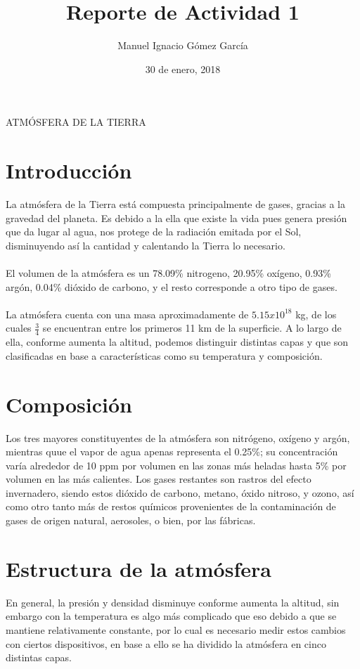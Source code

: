 \documentclass{article}
\title{Reporte de Actividad 1}
\author{Manuel Ignacio Gómez García}
\date{30 de enero, 2018}
\begin{document}
\maketitle ATMÓSFERA DE LA TIERRA

\section{Introducción}

La atmósfera de la Tierra está compuesta principalmente de gases, gracias a la gravedad del planeta. Es debido a la ella que existe la vida pues genera presión que da lugar al agua, nos protege de la radiación emitada por el Sol, disminuyendo así la cantidad y calentando la Tierra lo necesario.
\\
\\ El volumen de la atmósfera es un 78.09\% nitrogeno, 20.95\% oxígeno, 0.93\% argón, 0.04\% dióxido de carbono, y el resto corresponde a otro tipo de gases.
\\
\\ La atmósfera cuenta con una masa aproximadamente de $5.15x10^{18}$ kg, de los cuales $\frac{3}{4}$ se encuentran entre los primeros 11 km de la superficie. A lo largo de ella, conforme aumenta la altitud, podemos distinguir distintas capas y que son clasificadas en base a características como su temperatura y composición.

\section{Composición}

Los tres mayores constituyentes de la atmósfera son nitrógeno, oxígeno y argón, mientras quue el vapor de agua apenas representa el 0.25\%; su concentración varía alrededor de 10 ppm por volumen en las zonas más heladas hasta 5\% por volumen en las más calientes. Los gases restantes son rastros del efecto invernadero, siendo estos dióxido de carbono, metano, óxido nitroso, y ozono, así como otro tanto más de restos químicos provenientes de la contaminación de gases de origen natural, aerosoles, o bien, por las fábricas.

\section{Estructura de la atmósfera}

En general, la presión y densidad disminuye conforme aumenta la altitud,       sin embargo con la temperatura es algo más complicado que eso debido a que     se mantiene relativamente constante, por lo cual es necesario medir estos       cambios con ciertos dispositivos, en base a ello se ha dividido la             atmósfera en cinco distintas capas.
\end{document}

